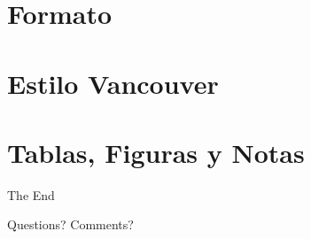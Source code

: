 \documentclass[
11pt, %
]{beamer}
\begin{document}
\section{Formato}

\section{Estilo Vancouver}

\section{Tablas, Figuras y Notas}


\begin{frame}[plain] %
	\begin{center}
		{\Huge The End}

		\bigskip\bigskip %

		{\LARGE Questions? Comments?}
	\end{center}
\end{frame}

\end{document}
